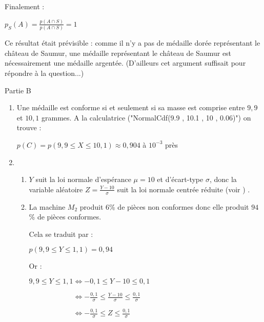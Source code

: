 \begin{corrige}
\begin{enumerate}
          \par
          Finalement :
          \par
          $p_S(A)=\frac{p(A \cap S)}{p(A \cap S)}=1$
          \par
          Ce résultat était prévisible : comme il n'y a pas de médaille dorée représentant le château de Saumur, une médaille représentant le château de Saumur est nécessairement une médaille argentée. (D'ailleurs cet argument suffisait pour répondre à la question...)
     \end{enumerate}
     \begin{h3}Partie B\end{h3}
     \begin{enumerate}
          \item
          Une médaille est conforme si et seulement si sa masse est comprise entre $9,9$ et $10,1$ grammes. A la calculatrice ("NormalCdf(9.9 , 10.1 , 10 , 0.06)") on trouve :
          \par
          $p(C)=p(9,9 \leqslant X \leqslant 10,1) \approx 0,904$ à $10^{-3}$ près
          \item
          \begin{enumerate}
               \item
               $Y$ suit la loi normale d'espérance $\mu = 10$ et d'écart-type $\sigma$, donc la variable aléatoire $Z=\frac{Y-10}{\sigma}$ suit la loi normale centrée réduite (voir ) .
               \item
               La machine $M_2$ produit $6$\% de pièces non conformes donc elle produit $94$\% de pièces conformes.
               \par
               Cela se traduit par :
               \par
               $p(9,9 \leqslant Y \leqslant 1,1)=0,94$
               \par
               Or :
               \par
               $9,9 \leqslant Y \leqslant 1,1 \Leftrightarrow -0,1 \leqslant Y-10 \leqslant 0,1 $
               \par
               $\phantom{9,9 \leqslant Y \leqslant 1,1 }\Leftrightarrow -\frac{0,1}{\sigma} \leqslant \frac{Y-10}{\sigma} \leqslant \frac{0,1}{\sigma} $
               \par
               $\phantom{9,9 \leqslant Y \leqslant 1,1 }\Leftrightarrow -\frac{0,1}{\sigma} \leqslant Z \leqslant \frac{0,1}{\sigma} $
               \par

\end{enumerate}
\end{enumerate}
\end{corrige}
